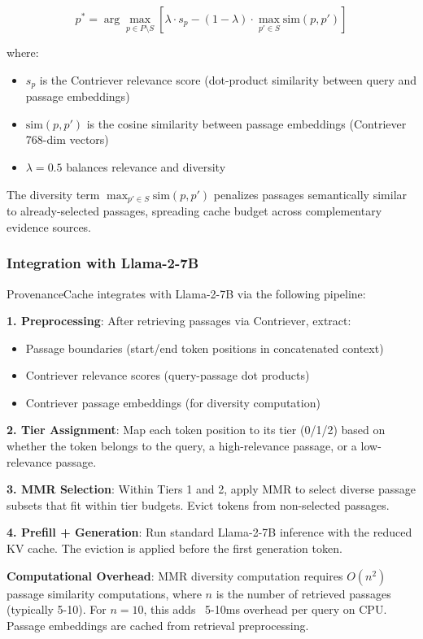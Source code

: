 $$
p^* = \arg\max_{p \in P \setminus S} \left[ \lambda \cdot s_p - (1-\lambda) \cdot \max_{p' \in S} \text{sim}(p, p') \right]
$$

where:
\begin{itemize}
\item $s_p$ is the Contriever relevance score (dot-product similarity between query and passage embeddings)
\item $\text{sim}(p, p')$ is the cosine similarity between passage embeddings (Contriever 768-dim vectors)
\item $\lambda = 0.5$ balances relevance and diversity
\end{itemize}

The diversity term $\max_{p' \in S} \text{sim}(p, p')$ penalizes passages semantically similar to already-selected passages, spreading cache budget across complementary evidence sources.

\subsubsection{Integration with Llama-2-7B}

ProvenanceCache integrates with Llama-2-7B via the following pipeline:

\textbf{1. Preprocessing}: After retrieving passages via Contriever, extract:
\begin{itemize}
\item Passage boundaries (start/end token positions in concatenated context)
\item Contriever relevance scores (query-passage dot products)
\item Contriever passage embeddings (for diversity computation)
\end{itemize}

\textbf{2. Tier Assignment}: Map each token position to its tier (0/1/2) based on whether the token belongs to the query, a high-relevance passage, or a low-relevance passage.

\textbf{3. MMR Selection}: Within Tiers 1 and 2, apply MMR to select diverse passage subsets that fit within tier budgets. Evict tokens from non-selected passages.

\textbf{4. Prefill + Generation}: Run standard Llama-2-7B inference with the reduced KV cache. The eviction is applied before the first generation token.

\textbf{Computational Overhead}: MMR diversity computation requires $O(n^2)$ passage similarity computations, where $n$ is the number of retrieved passages (typically 5-10). For $n=10$, this adds ~5-10ms overhead per query on CPU. Passage embeddings are cached from retrieval preprocessing.

